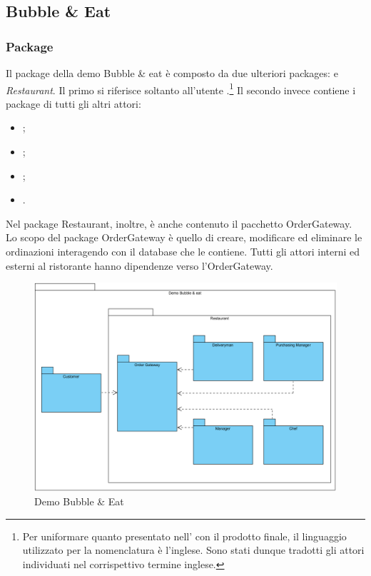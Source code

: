 \subsection{Bubble \& Eat} \label{bubbleeat}

\subsubsection{Package}
Il package della demo Bubble \& eat è composto da due ulteriori packages: \Customer{} e \textit{Restaurant}. 
Il primo si riferisce soltanto all'utente \Customer{}.\footnote{Per uniformare quanto presentato nell'\AnalisiDeiRequisiti{} con il prodotto finale, il linguaggio utilizzato per la nomenclatura è l'inglese. Sono stati dunque tradotti gli attori individuati nel corrispettivo termine inglese.} Il secondo invece contiene i package di tutti gli altri attori:
\begin{itemize}
	\item \Manager{};
	\item \Chef{};
	\item \Deliveryman{};
	\item \Purchasingmanager{}.
\end{itemize}
Nel package Restaurant, inoltre, è anche contenuto il pacchetto Order\-Gateway.\\
Lo scopo del package Order\-Gateway è quello di creare, modificare ed eliminare le ordinazioni interagendo con il database che le contiene.
Tutti gli attori interni ed esterni al ristorante hanno dipendenze verso l'Order\-Gateway.
\begin{figure}[H]
	\centering
	\includegraphics[width=14cm]{diagrammi_img/classi_e_package/demo_packages.png}
	\caption{Demo Bubble \& Eat}
\end{figure}

